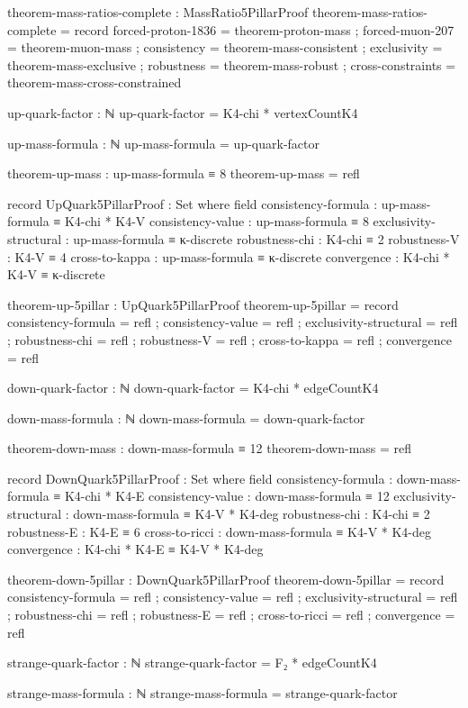 \documentclass[11pt,a4paper]{book}
\begin{document}
\begin{code}
theorem-mass-ratios-complete : MassRatio5PillarProof
theorem-mass-ratios-complete = record
  { forced-proton-1836 = theorem-proton-mass
  ; forced-muon-207 = theorem-muon-mass
  ; consistency = theorem-mass-consistent
  ; exclusivity = theorem-mass-exclusive
  ; robustness = theorem-mass-robust
  ; cross-constraints = theorem-mass-cross-constrained
  }

up-quark-factor : ℕ
up-quark-factor = K4-chi * vertexCountK4

up-mass-formula : ℕ
up-mass-formula = up-quark-factor

theorem-up-mass : up-mass-formula ≡ 8
theorem-up-mass = refl

record UpQuark5PillarProof : Set where
  field
    consistency-formula : up-mass-formula ≡ K4-chi * K4-V
    consistency-value : up-mass-formula ≡ 8
    exclusivity-structural : up-mass-formula ≡ κ-discrete
    robustness-chi : K4-chi ≡ 2
    robustness-V : K4-V ≡ 4
    cross-to-kappa : up-mass-formula ≡ κ-discrete
    convergence : K4-chi * K4-V ≡ κ-discrete

theorem-up-5pillar : UpQuark5PillarProof
theorem-up-5pillar = record
  { consistency-formula = refl
  ; consistency-value = refl
  ; exclusivity-structural = refl
  ; robustness-chi = refl
  ; robustness-V = refl
  ; cross-to-kappa = refl
  ; convergence = refl
  }

down-quark-factor : ℕ
down-quark-factor = K4-chi * edgeCountK4

down-mass-formula : ℕ
down-mass-formula = down-quark-factor

theorem-down-mass : down-mass-formula ≡ 12
theorem-down-mass = refl

record DownQuark5PillarProof : Set where
  field
    consistency-formula : down-mass-formula ≡ K4-chi * K4-E
    consistency-value : down-mass-formula ≡ 12
    exclusivity-structural : down-mass-formula ≡ K4-V * K4-deg
    robustness-chi : K4-chi ≡ 2
    robustness-E : K4-E ≡ 6
    cross-to-ricci : down-mass-formula ≡ K4-V * K4-deg
    convergence : K4-chi * K4-E ≡ K4-V * K4-deg

theorem-down-5pillar : DownQuark5PillarProof
theorem-down-5pillar = record
  { consistency-formula = refl
  ; consistency-value = refl
  ; exclusivity-structural = refl
  ; robustness-chi = refl
  ; robustness-E = refl
  ; cross-to-ricci = refl
  ; convergence = refl
  }

strange-quark-factor : ℕ
strange-quark-factor = F₂ * edgeCountK4

strange-mass-formula : ℕ
strange-mass-formula = strange-quark-factor


\end{code}
\end{document}
